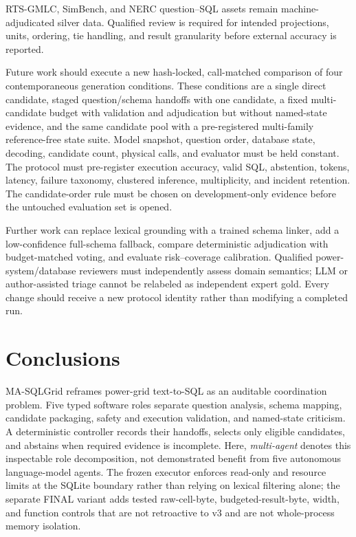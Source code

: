 \documentclass[applsci,article,submit,moreauthors]{Definitions/mdpi}
\newcommand{\masql}{MA-SQLGrid}
\begin{document}
RTS-GMLC, SimBench, and NERC question--SQL assets remain machine-adjudicated silver data. Qualified review is required for intended projections, units, ordering, tie handling, and result granularity before external accuracy is reported.

Future work should execute a new hash-locked, call-matched comparison of four contemporaneous generation conditions. These conditions are a single direct candidate, staged question/schema handoffs with one candidate, a fixed multi-candidate budget with validation and adjudication but without named-state evidence, and the same candidate pool with a pre-registered multi-family reference-free state suite. Model snapshot, question order, database state, decoding, candidate count, physical calls, and evaluator must be held constant. The protocol must pre-register execution accuracy, valid SQL, abstention, tokens, latency, failure taxonomy, clustered inference, multiplicity, and incident retention. The candidate-order rule must be chosen on development-only evidence before the untouched evaluation set is opened.

Further work can replace lexical grounding with a trained schema linker, add a low-confidence full-schema fallback, compare deterministic adjudication with budget-matched voting, and evaluate risk--coverage calibration. Qualified power-system/database reviewers must independently assess domain semantics; LLM or author-assisted triage cannot be relabeled as independent expert gold. Every change should receive a new protocol identity rather than modifying a completed run.

\section{Conclusions}

\masql{} reframes power-grid text-to-SQL as an auditable coordination problem. Five typed software roles separate question analysis, schema mapping, candidate packaging, safety and execution validation, and named-state criticism. A deterministic controller records their handoffs, selects only eligible candidates, and abstains when required evidence is incomplete. Here, \emph{multi-agent} denotes this inspectable role decomposition, not demonstrated benefit from five autonomous language-model agents. The frozen executor enforces read-only and resource limits at the SQLite boundary rather than relying on lexical filtering alone; the separate FINAL variant adds tested raw-cell-byte, budgeted-result-byte, width, and function controls that are not retroactive to v3 and are not whole-process memory isolation.
\end{document}

